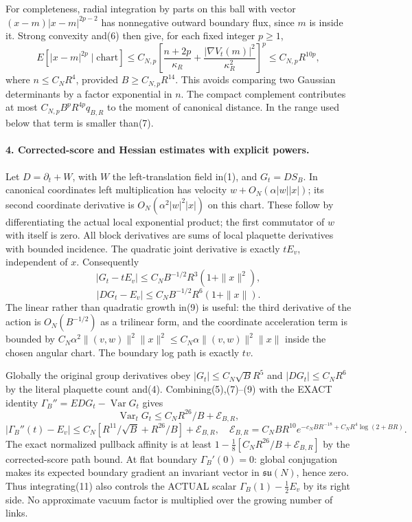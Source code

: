 \documentclass[11pt]{article}
\begin{document}
For completeness, radial integration by parts on this ball with vector
$(x-m)|x-m|^{2p-2}$ has nonnegative outward boundary flux, since $m$ is inside
it. Strong convexity and(6) then give, for each fixed integer $p\ge1$,
\[
 E[|x-m|^{2p}\mid\text{chart}]
 \le C_{N,p}\left[\frac{n+2p}{\kappa_R}
                  +\frac{|\nabla V_t(m)|^2}{\kappa_R^2}\right]^p
 \le C_{N,p}R^{10p},                                                   \tag{7}
\]
where $n\le C_NR^4$, provided $B\ge C_{N,p}R^{14}$.
This avoids comparing two Gaussian determinants by a factor exponential in
$n$. The compact complement contributes at most
$C_{N,p}B^pR^{4p}q_{B,R}$ to the moment of canonical distance. In the range
used below that term is smaller than(7).

\paragraph{4. Corrected-score and Hessian estimates with explicit powers.}
Let $D=\partial_t+W$, with $W$ the left-translation field in(1), and
$G_t=DS_B$. In canonical coordinates left multiplication has velocity
$w+O_N(\alpha|w||x|)$; its second coordinate derivative is
$O_N(\alpha^2|w|^2|x|)$ on this chart. These follow by differentiating the
actual local exponential product; the first commutator of $w$ with itself is
zero. All block derivatives are sums of local plaquette derivatives with
bounded incidence. The quadratic joint derivative is exactly $tE_v$,
independent of $x$. Consequently
\[
 |G_t-tE_v|\le C_N B^{-1/2}R^3(1+\|x\|^2),                             \tag{8}
\]
\[
 |DG_t-E_v|\le C_N B^{-1/2}R^6(1+\|x\|).                              \tag{9}
\]
The linear rather than quadratic growth in(9) is useful: the third derivative
of the action is $O_N(B^{-1/2})$ as a trilinear form, and the coordinate
acceleration term is bounded by
$C_N\alpha^2\|(v,w)\|^2\|x\|^2\le C_N\alpha\|(v,w)\|^2\|x\|$ inside
the chosen angular chart. The boundary log path is exactly $tv$.

Globally the original group derivatives obey
$|G_t|\le C_N\sqrt B R^5$ and $|DG_t|\le C_NR^6$ by the literal plaquette
count and(4). Combining(5),(7)--(9) with the EXACT identity
$\Gamma_B''=E DG_t-\operatorname{Var}G_t$ gives
\[
 \operatorname{Var}_tG_t\le C_N R^{26}/B+\mathcal E_{B,R},                \tag{10}
\]
\[
 |\Gamma_B''(t)-E_v|
 \le C_N[R^{11}/\sqrt B+R^{26}/B]+\mathcal E_{B,R},\quad
 \mathcal E_{B,R}=C_NBR^{10}
       e^{-c_NBR^{-18}+C_NR^4\log(2+BR)}.                               \tag{11}
\]
The exact normalized pullback affinity is at least
$1-\frac18[C_NR^{26}/B+\mathcal E_{B,R}]$ by the corrected-score path bound.
At flat boundary $\Gamma_B'(0)=0$: global conjugation makes its expected
boundary gradient an invariant vector in $\mathfrak{su}(N)$, hence zero.
Thus integrating(11) also controls the ACTUAL scalar
$\Gamma_B(1)-\frac12E_v$ by its right side. No approximate vacuum factor is
multiplied over the growing number of links.
\end{document}
